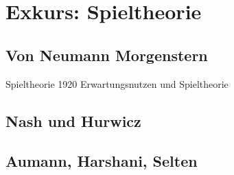 %
%
%

\chapter{Exkurs: Spieltheorie}
\label{Spieltheorie}

\section{Von Neumann Morgenstern}
Spieltheorie 1920
Erwartungsnutzen und Spieltheorie


\section{Nash und Hurwicz}

\section{Aumann, Harshani, Selten}




